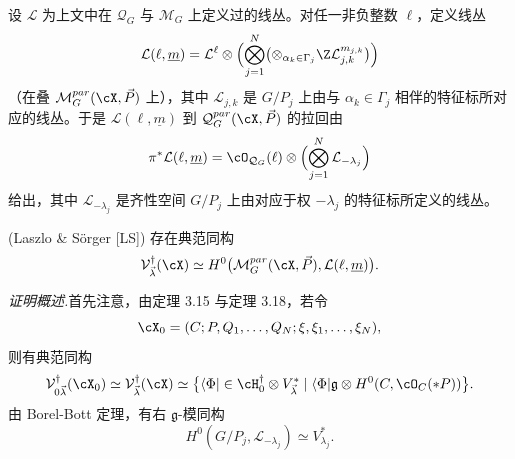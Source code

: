 设 $\mathcal L$ 为上文中在 $\mathcal Q_G$ 与 $\mathcal M_G$ 上定义过的线丛。对任一非负整数 $\ell$，定义线丛
\[
 \mathcal L(\ell,\underline m)=\mathcal L^\ell\otimes\Bigl(\bigotimes_{j=1}^N\bigl(\otimes_{\alpha_k\in\Gamma_j}\Z\mathcal L_{j,k}^{m_{j,k}}\bigr)\Bigr)
\]
（在叠 $\mathcal M_G^{par}(\cX,\vec P)$ 上），其中 $\mathcal L_{j,k}$ 是 $G/P_j$ 上由与 $\alpha_k\in\Gamma_j$ 相伴的特征标所对应的线丛。于是 $\mathcal L(\ell,\underline m)$ 到 $\mathcal Q_G^{par}(\cX,\vec P)$ 的拉回由
\[
 \pi^*\mathcal L(\ell,\underline m)=\cO_{\mathcal Q_G}(\ell)\otimes\Bigl(\bigotimes_{j=1}^N\mathcal L_{-\lambda_j}\Bigr)
\]
给出，其中 $\mathcal L_{-\lambda_j}$ 是齐性空间 $G/P_j$ 上由对应于权 $-\lambda_j$ 的特征标所定义的线丛。


\begin{theorem}[5.27] (Laszlo \& Sörger [LS])
存在典范同构
\[
 \mathcal V_{\vec\lambda}^\dagger(\cX)\simeq H^0\bigl(\mathcal M_G^{par}(\cX,\vec P),\mathcal L(\ell,\underline m)\bigr).
\]
\end{theorem}


\noindent\textit{证明概述.}\quad 首先注意，由定理 3.15 与定理 3.18，若令
\[
 \cX_0=(C;P,Q_1,\dots,Q_N;\xi,\xi_1,\dots,\xi_N),
\]
则有典范同构
\[
 \mathcal V_{0\vec\lambda}^\dagger(\cX_0)\simeq\mathcal V_{\vec\lambda}^\dagger(\cX)
 \simeq\bigl\{\langle\Phi|\in\cH_0^\dagger\otimes V_{\vec\lambda}^*\mid
 \langle\Phi|\mathfrak g\otimes H^0(C,\cO_C(*P))\bigr\}.
\]
由 Borel-Bott 定理，有右 $\mathfrak g$-模同构
\[
 H^0(G/P_j,\mathcal L_{-\lambda_j})\simeq V_{\lambda_j}^*.
\]




